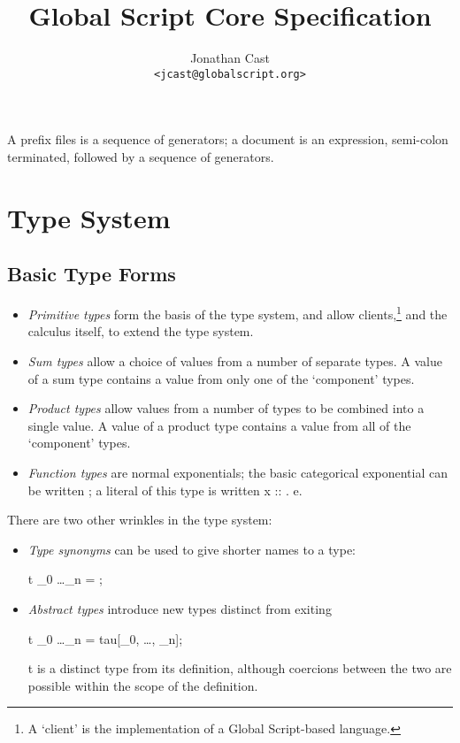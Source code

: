 \documentclass{article}
\title{Global Script Core Specification}
\author{Jonathan Cast\\\texttt{<jcast@globalscript.org>}}
\newcommand\defn[1]{\emph{#1}}
\newcommand\type{\hskwd{type}}
\newcommand\abstype{\hskwd{abstype}}
\begin{document}
\maketitle

A prefix files is a sequence of generators; a document is an expression, semi-colon terminated, followed by a sequence of generators.

\section{Type System}

\subsection{Basic Type Forms}

\begin{itemize}
    \item \defn{Primitive types} form the basis of the type system, and
    allow clients,\footnote{A `client' is the implementation of a Global Script-based language.}
    and the calculus itself,
    to extend the type system.

    \item \defn{Sum types} allow a choice of values from a number of separate types.
        A value of a sum type contains a value from only one of the `component' types.

    \item \defn{Product types} allow values from a number of types to be combined into a single value.
        A value of a product type contains a value from all of the `component' types.

    \item \defn{Function types} are normal exponentials;
        the basic categorical exponential can be written \<\alpha \rightarrow \beta\>;
        a literal of this type is written \<\lambda\;x :: \alpha. e\>.
\end{itemize}

There are two other wrinkles in the type system:
\begin{itemize}
    \item \defn{Type synonyms} can be used to give shorter names to a type:
        \begin{haskell} \type t \alpha_0 \ldots \alpha_n = ; \end{haskell}

    \item \defn{Abstract types} introduce new types distinct from exiting
        \begin{haskell}  \abstype t \alpha_0 \ldots \alpha_n = tau[\alpha_0, \ldots, \alpha_n]; \end{haskell}
        \<t\> is a distinct type from its definition,
        although coercions between the two are possible within the scope of the definition.
\end{itemize}
\end{document}
